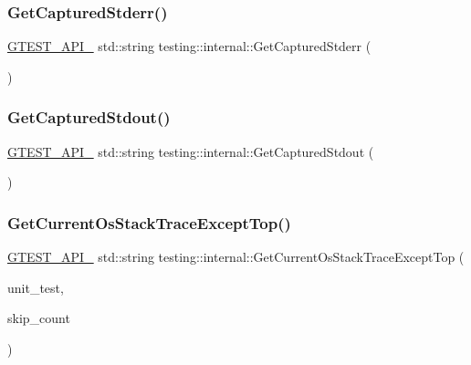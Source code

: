 \subsubsection{\texorpdfstring{GetCapturedStderr()}{GetCapturedStderr()}}
{\footnotesize\ttfamily \mbox{\hyperlink{gtest-port_8h_aa73be6f0ba4a7456180a94904ce17790}{G\+T\+E\+S\+T\+\_\+\+A\+P\+I\+\_\+}} std\+::string testing\+::internal\+::\+Get\+Captured\+Stderr (\begin{DoxyParamCaption}{ }\end{DoxyParamCaption})}

\mbox{\label{namespacetesting_1_1internal_aed657219a9856a8d249a3230de0c54ce}} 
\subsubsection{\texorpdfstring{GetCapturedStdout()}{GetCapturedStdout()}}
{\footnotesize\ttfamily \mbox{\hyperlink{gtest-port_8h_aa73be6f0ba4a7456180a94904ce17790}{G\+T\+E\+S\+T\+\_\+\+A\+P\+I\+\_\+}} std\+::string testing\+::internal\+::\+Get\+Captured\+Stdout (\begin{DoxyParamCaption}{ }\end{DoxyParamCaption})}

\mbox{\label{namespacetesting_1_1internal_ae7ae495d3207e26968dfbd537c5e6dee}} 
\subsubsection{\texorpdfstring{GetCurrentOsStackTraceExceptTop()}{GetCurrentOsStackTraceExceptTop()}}
{\footnotesize\ttfamily \mbox{\hyperlink{gtest-port_8h_aa73be6f0ba4a7456180a94904ce17790}{G\+T\+E\+S\+T\+\_\+\+A\+P\+I\+\_\+}} std\+::string testing\+::internal\+::\+Get\+Current\+Os\+Stack\+Trace\+Except\+Top (\begin{DoxyParamCaption}\item[{\mbox{\hyperlink{classtesting_1_1_unit_test}{Unit\+Test}} $\ast$}]{unit\+\_\+test,  }\item[{int}]{skip\+\_\+count }\end{DoxyParamCaption})}

